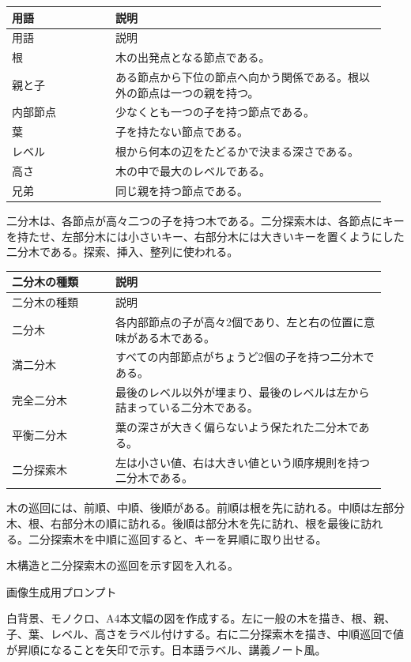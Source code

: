 \documentclass[uplatex,dvipdfmx,a4paper,10pt]{jsarticle}
\begin{document}
\begin{longtable}{>{\raggedright\arraybackslash}p{0.26\linewidth} >{\raggedright\arraybackslash}p{0.68\linewidth}}
\toprule
用語 & 説明 \\
\midrule
\endfirsthead
\toprule
用語 & 説明 \\
\midrule
\endhead
根 & 木の出発点となる節点である。 \\
親と子 & ある節点から下位の節点へ向かう関係である。根以外の節点は一つの親を持つ。 \\
内部節点 & 少なくとも一つの子を持つ節点である。 \\
葉 & 子を持たない節点である。 \\
レベル & 根から何本の辺をたどるかで決まる深さである。 \\
高さ & 木の中で最大のレベルである。 \\
兄弟 & 同じ親を持つ節点である。 \\
\bottomrule
\end{longtable}
二分木は、各節点が高々二つの子を持つ木である。二分探索木は、各節点にキーを持たせ、左部分木には小さいキー、右部分木には大きいキーを置くようにした二分木である。探索、挿入、整列に使われる。

\begin{longtable}{>{\raggedright\arraybackslash}p{0.26\linewidth} >{\raggedright\arraybackslash}p{0.68\linewidth}}
\toprule
二分木の種類 & 説明 \\
\midrule
\endfirsthead
\toprule
二分木の種類 & 説明 \\
\midrule
\endhead
二分木 & 各内部節点の子が高々2個であり、左と右の位置に意味がある木である。 \\
満二分木 & すべての内部節点がちょうど2個の子を持つ二分木である。 \\
完全二分木 & 最後のレベル以外が埋まり、最後のレベルは左から詰まっている二分木である。 \\
平衡二分木 & 葉の深さが大きく偏らないよう保たれた二分木である。 \\
二分探索木 & 左は小さい値、右は大きい値という順序規則を持つ二分木である。 \\
\bottomrule
\end{longtable}
木の巡回には、前順、中順、後順がある。前順は根を先に訪れる。中順は左部分木、根、右部分木の順に訪れる。後順は部分木を先に訪れ、根を最後に訪れる。二分探索木を中順に巡回すると、キーを昇順に取り出せる。

\begin{todobox}
木構造と二分探索木の巡回を示す図を入れる。

画像生成用プロンプト

白背景、モノクロ、A4本文幅の図を作成する。左に一般の木を描き、根、親、子、葉、レベル、高さをラベル付けする。右に二分探索木を描き、中順巡回で値が昇順になることを矢印で示す。日本語ラベル、講義ノート風。
\end{todobox}
\end{document}
